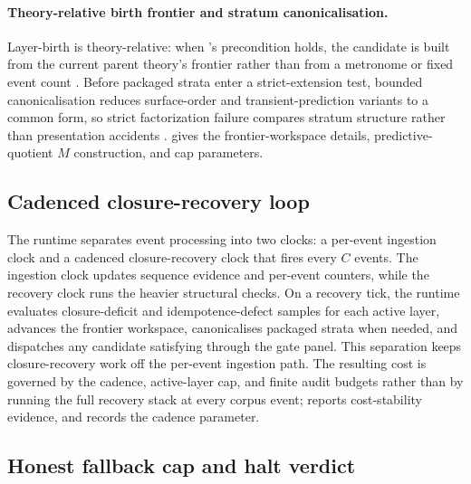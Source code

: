 \documentclass{article}
\theoremstyle{definition}
\begin{document}
\paragraph{Theory-relative birth frontier and stratum canonicalisation.}\label{subsec:frontier-canonicalisation}
Layer-birth is theory-relative: when 's precondition holds, the candidate is built from the current parent theory's frontier rather than from a metronome or fixed event count \cite{Tsiokos2026FoundationsIII}. Before packaged strata enter a strict-extension test, bounded canonicalisation reduces surface-order and transient-prediction variants to a common form, so strict factorization failure compares stratum structure rather than presentation accidents \cite{Tsiokos2026HolonomyMemory}.  gives the frontier-workspace details, predictive-quotient \(M\) construction, and cap parameters.

\subsection{Cadenced closure-recovery loop}\label{subsec:cadence-loop}

The runtime separates event processing into two clocks: a per-event ingestion clock and a cadenced closure-recovery clock that fires every \(C\) events. The ingestion clock updates sequence evidence and per-event counters, while the recovery clock runs the heavier structural checks. On a recovery tick, the runtime evaluates closure-deficit and idempotence-defect samples for each active layer, advances the frontier workspace, canonicalises packaged strata when needed, and dispatches any candidate satisfying  through the gate panel. This separation keeps closure-recovery work off the per-event ingestion path. The resulting cost is governed by the cadence, active-layer cap, and finite audit budgets rather than by running the full recovery stack at every corpus event;  reports cost-stability evidence, and  records the cadence parameter.

\subsection{Honest fallback cap and halt verdict}\label{subsec:fallback-halt}
\end{document}
